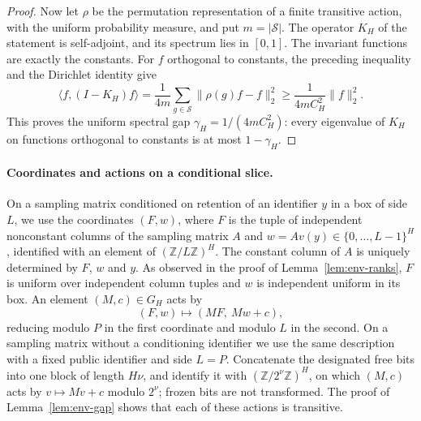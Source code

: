 \begin{proof}
Now let $\rho$ be the permutation representation of a finite transitive
action, with the uniform probability measure, and put $m=|\mathcal S|$.
The operator $K_H$ of the statement is self-adjoint, and its spectrum lies in $[0,1]$. The invariant
functions are exactly the constants. For $f$ orthogonal to constants,
the preceding inequality and the Dirichlet identity give
\[
\langle f,(I-K_H)f\rangle
=\frac1{4m}\sum_{g\in\mathcal S}\|\rho(g)f-f\|_2^2
\ge\frac1{4mC_H^2}\|f\|_2^2.
\]
This proves the uniform spectral gap $\gamma_H=1/(4mC_H^2)$: every
eigenvalue of $K_H$ on functions orthogonal to constants is at most
$1-\gamma_H$.
\end{proof}

\paragraph{Coordinates and actions on a conditional slice.}
On a sampling matrix conditioned on retention of an identifier $y$ in a box of
side $L$, we use the coordinates $(F,w)$, where $F$ is the tuple of independent nonconstant columns of the
sampling matrix $A$ and $w=Av(y)\in\{0,\ldots,L-1\}^H$, identified with
an element of $(\mathbb Z/L\mathbb Z)^H$.  The constant column of $A$ is
uniquely determined by $F$, $w$ and $y$.  As observed in the proof of
Lemma~\ref{lem:env-ranks}, $F$ is uniform over independent column tuples and $w$ is
independent uniform in its box.  An element $(M,c)\in G_H$ acts by
\begin{equation}
 (F,w)\longmapsto(MF,\ Mw+c),
 \label{eq:env-slice-action}
\end{equation}
reducing modulo $P$ in the first coordinate and modulo $L$ in the
second.  On a sampling matrix without a conditioning identifier we use the same
description with a fixed public identifier and side $L=P$.
Concatenate the designated free bits into one block of length $H\nu$,
and identify it with $(\mathbb Z/2^\nu\mathbb Z)^H$, on which $(M,c)$ acts by
$v\mapsto Mv+c$ modulo $2^\nu$; frozen bits are not transformed.  The
proof of Lemma~\ref{lem:env-gap} shows that each of these actions is
transitive.

